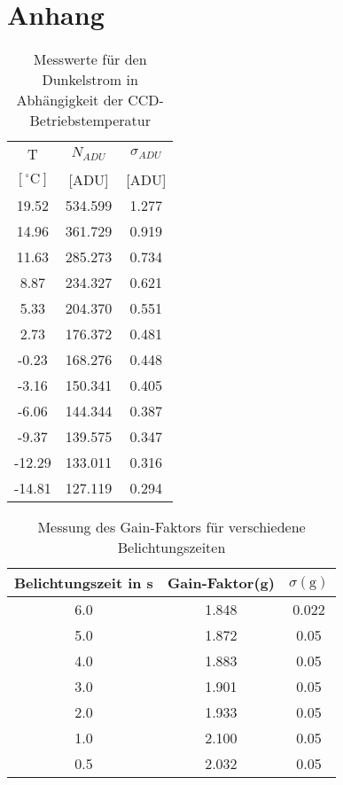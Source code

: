 \section{Anhang}

\begin{table}[h!]
\centering
\begin{tabular}{c c c}
T & $N_{ADU}$ & $\sigma_{ADU}$ \\
$[^\circ \mathrm{C}]$ & [ADU] & [ADU]\\
\hline
19.52	& 534.599	& 1.277\\
14.96	& 361.729	& 0.919\\
11.63	& 285.273	& 0.734\\
8.87	& 234.327	& 0.621\\
5.33	& 204.370	& 0.551\\
2.73	& 176.372	& 0.481\\
-0.23	& 168.276	& 0.448\\
-3.16	& 150.341	& 0.405\\
-6.06	& 144.344	& 0.387\\
-9.37	& 139.575	& 0.347\\
-12.29	& 133.011	& 0.316\\
-14.81	& 127.119	& 0.294\\
\end{tabular}
\caption{Messwerte für den Dunkelstrom in Abhängigkeit der CCD-Betriebstemperatur}
\label{tbl:adu_temp}
\end{table}

\begin{table}[h!]
\centering
\begin{tabular}{c c c }
Belichtungszeit in s & Gain-Faktor(g) & $\sigma (\mathrm{g})$\\
\hline
6.0 & 1.848 & 0.022\\
5.0 & 1.872 & 0.05\\
4.0 & 1.883 & 0.05\\
3.0	& 1.901 & 0.05\\
2.0 & 1.933 & 0.05\\
1.0 & 2.100 & 0.05\\
0.5	& 2.032 & 0.05\\
\end{tabular}
\caption{Messung des Gain-Faktors für verschiedene Belichtungszeiten}
\label{tbl:gain}
\end{table}

